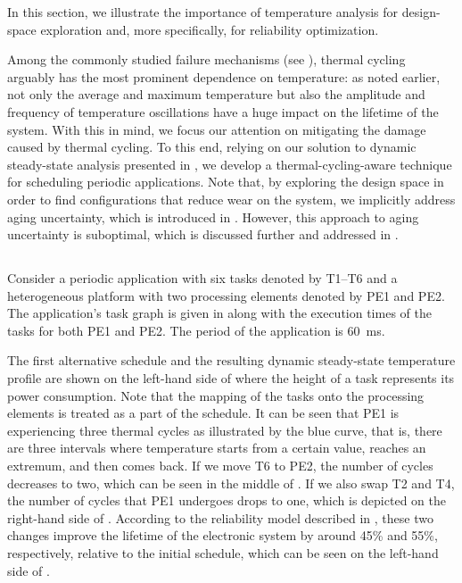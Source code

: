 In this section, we illustrate the importance of temperature analysis for
design-space exploration and, more specifically, for reliability optimization.

Among the commonly studied failure mechanisms (see ),
thermal cycling arguably has the most prominent dependence on temperature: as
noted earlier, not only the average and maximum temperature but also the
amplitude and frequency of temperature oscillations have a huge impact on the
lifetime of the system. With this in mind, we focus our attention on mitigating
the damage caused by thermal cycling. To this end, relying on our solution to
dynamic steady-state analysis presented in , we
develop a thermal-cycling-aware technique for scheduling periodic applications.
Note that, by exploring the design space in order to find configurations that
reduce wear on the system, we implicitly address aging uncertainty, which is
introduced in . However, this approach to aging
uncertainty is suboptimal, which is discussed further and addressed in
.

\subsection{\motivationtitle}

Consider a periodic application with six tasks denoted by T1--T6 and a
heterogeneous platform with two processing elements denoted by PE1 and PE2. The
application's task graph is given in  along with
the execution times of the tasks for both PE1 and PE2. The period of the
application is 60~ms.

The first alternative schedule and the resulting dynamic steady-state
temperature profile are shown on the left-hand side of
 where the height of a task represents its power
consumption. Note that the mapping of the tasks onto the processing elements is
treated as a part of the schedule. It can be seen that PE1 is experiencing three
thermal cycles as illustrated by the blue curve, that is, there are three
intervals where temperature starts from a certain value, reaches an extremum,
and then comes back. If we move T6 to PE2, the number of cycles decreases to
two, which can be seen in the middle of . If we
also swap T2 and T4, the number of cycles that PE1 undergoes drops to one, which
is depicted on the right-hand side of . According
to the reliability model described in , these two
changes improve the lifetime of the electronic system by around 45\% and 55\%,
respectively, relative to the initial schedule, which can be seen on the
left-hand side of .

